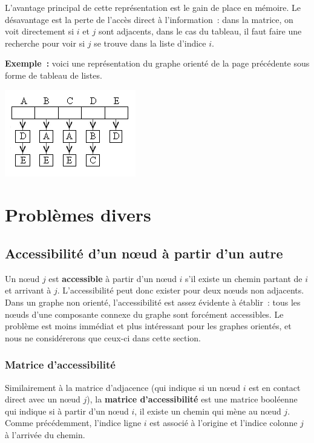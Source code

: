 			L'avantage principal de cette représentation est le gain de 
			place en mémoire. Le désavantage est la perte de l'accès
			direct à l'information~: dans la matrice, on voit directement 
			si $i$ et $j$ sont adjacents, dans le cas du tableau, il faut 
			faire une recherche pour voir si $j$ se trouve dans la liste 
			d'indice $i$.

			\textbf{Exemple~:} voici une représentation du graphe orienté 
			de la page précédente sous forme de tableau de listes.
			\begin{center}
			\includegraphics[width=5.715cm,height=3.784cm]{image/a2012Logique2eme-img051.png}
			\end{center}
			

\section{Problèmes divers}

	\subsection{Accessibilité d'un n{\oe}ud à partir d'un autre}

		Un n{\oe}ud $j$ est \textbf{accessible} à partir d'un n{\oe}ud $i$ 
		s'il existe un chemin partant de $i$ et arrivant à $j$. L'accessibilité 
		peut donc exister pour deux n{\oe}uds non adjacents. 
		Dans un graphe non orienté, l'accessibilité est assez évidente à établir~: 
		tous les n{\oe}uds d'une composante connexe du graphe sont forcément 
		accessibles. Le problème est moins immédiat et plus intéressant pour 
		les graphes orientés, et nous ne considérerons que ceux-ci 
		dans cette section.

		\subsubsection{Matrice d'accessibilité}

			Similairement à la matrice d'adjacence (qui indique si un n{\oe}ud 
			$i$ est en contact direct avec un n{\oe}ud $j$), la \textbf{matrice 
			d'accessibilité} est une matrice booléenne qui indique si à partir d'un 
			n{\oe}ud $i$, il existe un chemin qui mène au n{\oe}ud $j$. Comme 
			précédemment, l'indice ligne $i$ est associé à l'origine et l'indice 
			colonne $j$ à l'arrivée du chemin.

